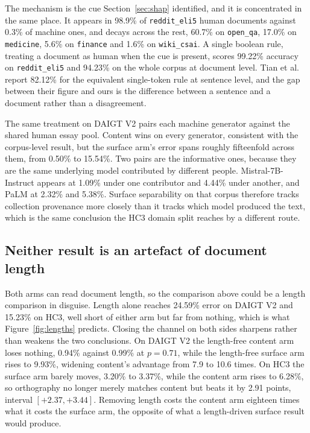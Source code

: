 \documentclass[conference,a4paper]{IEEEtran}
\begin{document}
The mechanism is the cue Section~\ref{sec:shap} identified, and it is concentrated in the same place. It appears in 98.9\% of \texttt{reddit\_eli5} human documents against 0.3\% of machine ones, and decays across the rest, 60.7\% on \texttt{open\_qa}, 17.0\% on \texttt{medicine}, 5.6\% on \texttt{finance} and 1.6\% on \texttt{wiki\_csai}. A single boolean rule, treating a document as human when the cue is present, scores 99.22\% accuracy on \texttt{reddit\_eli5} and 94.23\% on the whole corpus at document level. Tian et al.~\cite{Tian2023multiscale} report 82.12\% for the equivalent single-token rule at sentence level, and the gap between their figure and ours is the difference between a sentence and a document rather than a disagreement.

The same treatment on DAIGT V2 pairs each machine generator against the shared human essay pool. Content wins on every generator, consistent with the corpus-level result, but the surface arm's error spans roughly fifteenfold across them, from 0.50\% to 15.54\%. Two pairs are the informative ones, because they are the same underlying model contributed by different people. Mistral-7B-Instruct appears at 1.09\% under one contributor and 4.44\% under another, and PaLM at 2.32\% and 5.38\%. Surface separability on that corpus therefore tracks collection provenance more closely than it tracks which model produced the text, which is the same conclusion the HC3 domain split reaches by a different route.

\subsection{Neither result is an artefact of document length}
\label{sec:length}

Both arms can read document length, so the comparison above could be a length comparison in disguise. Length alone reaches 24.59\% error on DAIGT V2 and 15.23\% on HC3, well short of either arm but far from nothing, which is what Figure~\ref{fig:lengths} predicts. Closing the channel on both sides sharpens rather than weakens the two conclusions. On DAIGT V2 the length-free content arm loses nothing, 0.94\% against 0.99\% at $p=0.71$, while the length-free surface arm rises to 9.93\%, widening content's advantage from 7.9 to 10.6 times. On HC3 the surface arm barely moves, 3.20\% to 3.37\%, while the content arm rises to 6.28\%, so orthography no longer merely matches content but beats it by 2.91 points, interval $[+2.37, +3.44]$. Removing length costs the content arm eighteen times what it costs the surface arm, the opposite of what a length-driven surface result would produce.
\end{document}
